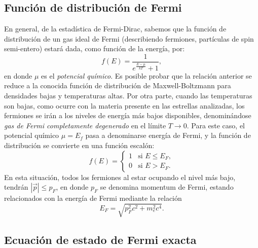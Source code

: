 \subsection{Función de distribución de Fermi}
En general, de la estadística de Fermi-Dirac, sabemos que la función de distribución de un gas ideal de Fermi (describiendo fermiones, partículas de spin semi-entero) estará dada, como función de la energía, por:
\begin{equation}
 f(E)=\frac{1}{e^{\frac{E-\mu}{kT}}+1},
\end{equation}
en donde $\mu$ es el \textit{potencial químico}. Es posible probar que la relación anterior se reduce a la conocida función de distribución de Maxwell-Boltzmann para densidades bajas y temperaturas altas. Por otra parte, cuando las temperaturas son bajas, como ocurre con la materia presente en las estrellas analizadas, los fermiones se irán a los niveles de energía más bajos disponibles, denominándose \textit{gas de Fermi completamente degenerado} en el límite $T\to 0$. Para este caso, el potencial químico $\mu=E_f$ pasa a denominarse energía de Fermi, y la función de distribución se convierte en una función escalón:
\begin{equation}\label{fermidegenerada}
f(E)=\begin{cases}
   1& \text{si } E \leq E_F ,\\
   0& \text{si } E > E_F.
  \end{cases}
\end{equation}
En esta situación, todos los fermiones al estar ocupando el nivel más bajo, tendrán $\left|\vec{p}\right|\le p_F$, en donde $p_F$ se denomina momentum de Fermi, estando relacionados con la energía de Fermi mediante la relación
\begin{equation}\label{energiafermi}
E_F=\sqrt{p_F^2 c^2+m_e^2 c^4}.
\end{equation}

\subsection{Ecuación de estado de Fermi exacta}

